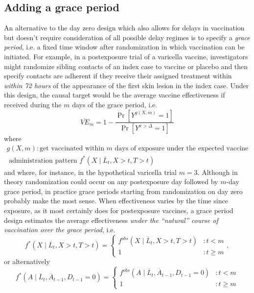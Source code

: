 \begin{appendices}
\begin{refsection}
    \subsection{Adding a grace period} \label{sec:graceperiod}

    An alternative to the day zero design which also allows for delays in vaccination but doesn't require consideration of all possible delay regimes is to specify a \textit{grace period}, i.e. a fixed time window after randomization in which vaccination can be initiated. For example, in a postexposure trial of a varicella vaccine, investigators might randomize sibling contacts of an index case to vaccine or placebo and then specify contacts are adherent if they receive their assigned treatment within \textit{within 72 hours} of the appearance of the first skin lesion in the index case. Under this design, the causal target would be the average vaccine effectiveness if received during the $m$ days of the grace period, i.e.
    $$
    \overline{VE}_m = 1 - \frac{\Pr[Y^{g(X,m)} = 1]}{\Pr[Y^{x > \Delta} = 1]}
    $$ 
    where
    \begin{gather*}
        g(X,m): \text{get vaccinated within $m$ days of exposure under the expected vaccine } \\ \text{ administration pattern }  f^*(X \mid \overline{L}_t, X > t, T > t)
    \end{gather*}
    and where, for instance, in the hypothetical varicella trial $m = 3$. Although in theory randomization could occur on any postexposure day followed by $m$-day grace period, in practice grace periods starting from randomization on day zero probably make the most sense. When effectiveness varies by the time since exposure, as it most certainly does for postexposure vaccines, a grace period design estimates the average effectiveness \textit{under the ``natural'' course of vaccination over the grace period}, i.e.
     $$f^*(X \mid \overline{L}_t, X > t, T > t) = \begin{cases} 
        f^{obs}(X \mid \overline{L}_t, X > t, T > t) & : t < m\\
        1 & : t \geq m
     \end{cases},$$
    or alternatively
    $$f^*(A \mid \overline{L}_t, \overline{A}_{t-1}, D_{t-1} = 0) = \begin{cases} 
        f^{obs}(A \mid \overline{L}_t, \overline{A}_{t-1}, D_{t-1} = 0) & : t < m\\
        1 & : t \geq m
     \end{cases}$$

\end{refsection}
\end{appendices}
